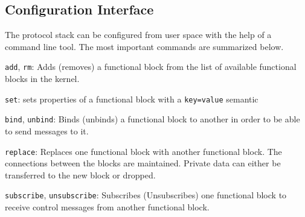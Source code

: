 \documentclass{sig-alternate}
\begin{document}

\subsection{Configuration Interface}
The protocol stack can be configured from user space with the help of a command line tool. The most important commands are summarized below.
\begin{compactitem}
\item \texttt{add}, \texttt{rm}: Adds (removes) a functional block from the list of available functional blocks in the kernel. 
\item \texttt{set}: sets properties of a functional block with a \texttt{key=value} semantic
\item \texttt{bind}, \texttt{unbind}: Binds (unbinds) a functional block to another in order to be able to send messages to it. 
\item \texttt{replace}: Replaces one functional block with another functional block. The connections between the blocks are maintained. Private data can either be transferred to the new block or dropped.
\item \texttt{subscribe}, \texttt{unsubscribe}: Subscribes (Unsubscribes) one functional block to receive control messages from another functional block.
\end{compactitem}
\end{document}
